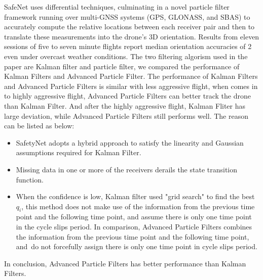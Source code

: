 \documentclass[journal,onecolumn]{IEEEtran}
\begin{document}
SafeNet uses differential techniques, culminating in a novel particle filter framework running over multi-GNSS systems
(GPS, GLONASS, and SBAS) to accurately compute the relative locations between each receiver pair and then to translate these
measurements into the drone's 3D orientation. Results from eleven sessions of five to seven minute flights report median orientation accuracies
of 2 even under overcast weather conditions. The two filtering algorism used in the paper are Kalman filter and particle filter, we
compared the performance of Kalman Filters and Advanced Particle Filter. The performance of Kalman Filters and Advanced
Particle Filters is similar with less aggressive flight, when comes in to highly aggressive flight, Advanced Particle Filters can
better track the drone than Kalman Filter. And after the highly aggressive flight, Kalman Fliter has large deviation, while
Advanced Particle Filters still performs well. The reason can be listed as below:
\begin{itemize}
\item SafetyNet adopts a hybrid approach to satisfy the linearity and Gaussian assumptions required for Kalman Filter.
\item Missing data in one or more of the receivers derails the state transition function.
\item When the confidence is low, Kalman filter used "grid search" to find the best $q_i$,
this method does not make use of the information from the previous time point and the following time point,
and assume there is only one time point in the cycle slips period.
In comparison, Advanced Particle Filters combines the information from the
previous time point and the following time point, and do not forcefully assign
there is only one time point in cycle slips period.
\end{itemize}

In conclusion, Advanced Particle Filters has better performance than Kalman Filters.




\end{document}
